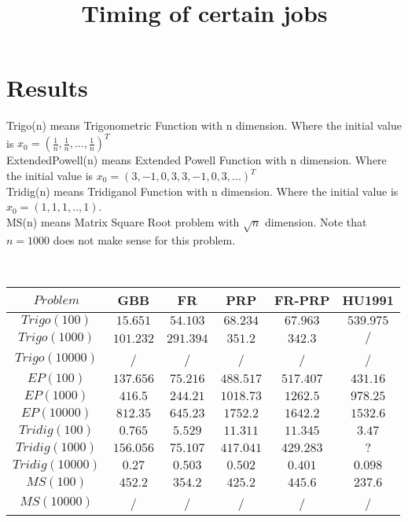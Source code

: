 \documentclass{article}
\begin{document}
\section{Results}
Trigo(n) means Trigonometric Function with n dimension. Where the initial value is $x_0 = (\frac{1}{n}, \frac{1}{n}, ... , \frac{1}{n})^T$ \\
ExtendedPowell(n) means Extended Powell Function with n dimension. Where the initial value is $x_0=(3,-1,0,3,3,-1,0,3,...)^T$ \\
Tridig(n) means Tridiganol Function with n dimension. Where the initial value is $x_0 = (1,1,1,..,1)$. \\
MS(n) means Matrix Square Root problem with $\sqrt{n}$ dimension. 
Note that $n=1000$ does not make sense for this problem.

\begin{table}[h!]
\title{ Timing of certain jobs }
\\
	\centering
	\begin{tabular}{|c||c|c|c|c|c|}
		\hline
		 $Problem$ & GBB & FR & PRP & FR-PRP & HU1991 \\ \hline
		  
		 $Trigo(100)$ & $15.651$ & $54.103$ & $68.234$ & $67.963$ & $539.975$ \\ \hline
		 
		 $Trigo(1000)$ & $101.232$ & $291.394$ & $351.2$ & $342.3$ & $/$ \\ \hline
		 
		 $Trigo(10000)$ & / & / & / & / & / \\ \hline
		 
		 $EP(100)$ & $137.656$ & $75.216$ & $488.517$ & $517.407$ & $431.16$ \\ \hline
		 
		 $EP(1000)$ & $416.5$ & $244.21$ & $1018.73$ & $1262.5$ & $978.25$ \\ \hline
		  
		 $EP(10000)$ & $812.35$ & $645.23$ & $1752.2$ & $1642.2$ & $1532.6$ \\ \hline
		 
		 $Tridig(100)$ & $0.765$ & $5.529$ & $11.311$ & $11.345$ & $3.47$ \\ \hline
		 
		 $Tridig(1000)$ & $156.056$ & $75.107$ & $417.041$ & $429.283$ & $?$ \\ \hline
		 
		 $Tridig(10000)$ & $0.27$ & $0.503$ & $0.502$ & $0.401$ & $0.098$ \\ \hline
		 
		 $MS(100)$ & $452.2$ & $354.2$ & $425.2$ & $445.6$ & $237.6$ \\ \hline
		 
		 $MS(10000)$ & / & / & / & / & / \\ \hline
		  
		
	\end{tabular}

\end{table}
\end{document}
